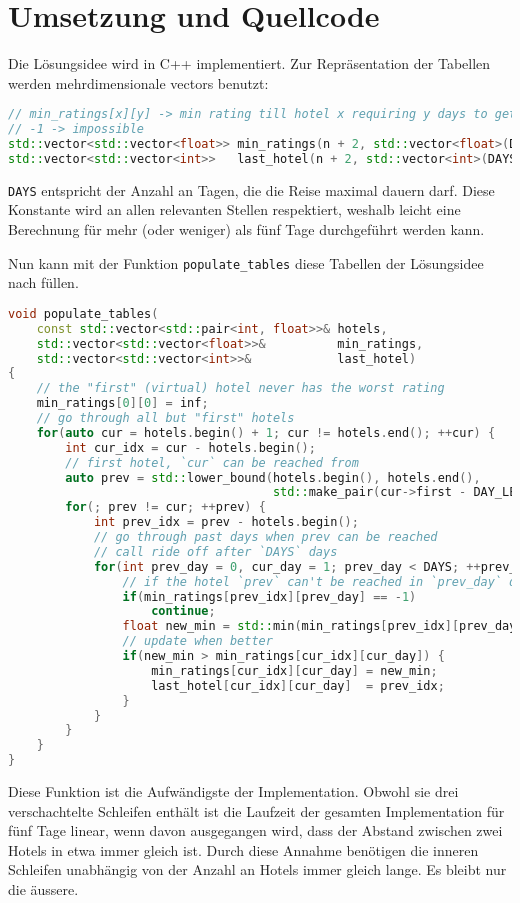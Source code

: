 \documentclass[a4paper,10pt,ngerman]{scrartcl}
\begin{document}
\section{Umsetzung und Quellcode}
Die Lösungsidee wird in C++ implementiert.
Zur Repräsentation der Tabellen werden mehrdimensionale vectors benutzt:
\begin{lstlisting}[language=C++]
// min_ratings[x][y] -> min rating till hotel x requiring y days to get to
// -1 -> impossible
std::vector<std::vector<float>> min_ratings(n + 2, std::vector<float>(DAYS + 1, -1));
std::vector<std::vector<int>>   last_hotel(n + 2, std::vector<int>(DAYS + 1, -1));
\end{lstlisting}
\lstinline{DAYS} entspricht der Anzahl an Tagen, die die Reise maximal dauern darf.
Diese Konstante wird an allen relevanten Stellen respektiert, weshalb leicht eine Berechnung für mehr (oder weniger) als fünf Tage durchgeführt werden kann.

Nun kann mit der Funktion \lstinline{populate_tables} diese Tabellen der Lösungsidee nach füllen.
\begin{lstlisting}[language=C++]
void populate_tables(
    const std::vector<std::pair<int, float>>& hotels,
    std::vector<std::vector<float>>&          min_ratings,
    std::vector<std::vector<int>>&            last_hotel)
{
    // the "first" (virtual) hotel never has the worst rating
    min_ratings[0][0] = inf;
    // go through all but "first" hotels
    for(auto cur = hotels.begin() + 1; cur != hotels.end(); ++cur) {
        int cur_idx = cur - hotels.begin();
        // first hotel, `cur` can be reached from
        auto prev = std::lower_bound(hotels.begin(), hotels.end(),
                                     std::make_pair(cur->first - DAY_LEN, .0f));
        for(; prev != cur; ++prev) {
            int prev_idx = prev - hotels.begin();
            // go through past days when prev can be reached
            // call ride off after `DAYS` days
            for(int prev_day = 0, cur_day = 1; prev_day < DAYS; ++prev_day, ++cur_day) {
                // if the hotel `prev` can't be reached in `prev_day` days
                if(min_ratings[prev_idx][prev_day] == -1)
                    continue;
                float new_min = std::min(min_ratings[prev_idx][prev_day], cur->second);
                // update when better
                if(new_min > min_ratings[cur_idx][cur_day]) {
                    min_ratings[cur_idx][cur_day] = new_min;
                    last_hotel[cur_idx][cur_day]  = prev_idx;
                }
            }
        }
    }
}
\end{lstlisting}
Diese Funktion ist die Aufwändigste der Implementation.
Obwohl sie drei verschachtelte Schleifen enthält ist die Laufzeit der gesamten Implementation für fünf Tage linear, wenn davon ausgegangen wird, dass der Abstand zwischen zwei Hotels in etwa immer gleich ist.
Durch diese Annahme benötigen die inneren Schleifen unabhängig von der Anzahl an Hotels immer gleich lange.
Es bleibt nur die äussere.
\end{document}
